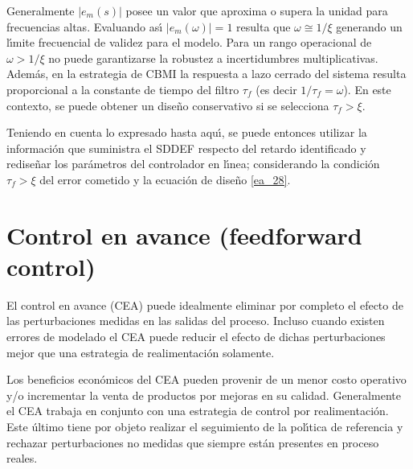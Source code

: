 Generalmente $|e_{m}(s)|$ posee un valor que aproxima o supera la unidad para frecuencias altas. Evaluando
as{\'\i} $|e_{m}(\omega)|=1$ resulta que $\omega\cong 1/\xi$ generando un l{\'\i}mite frecuencial de validez para el
modelo. Para un rango operacional de $\omega>1/\xi$ no puede garantizarse la robustez a incertidumbres
multiplicativas. Adem{\'a}s, en la estrategia de CBMI la respuesta a lazo cerrado del sistema resulta
proporcional a la constante de tiempo del filtro $\tau_{f}$ (es decir $1/\tau_{f}=\omega$). En este
contexto, se puede obtener un dise{\~n}o conservativo si se selecciona $\tau_{f}> \xi$.

Teniendo en cuenta lo expresado hasta aqu{\'\i}, se puede entonces utilizar la informaci{\'o}n que suministra el
SDDEF respecto del retardo identificado y redise{\~n}ar los par{\'a}metros del controlador en l{\'\i}nea; considerando la
condici{\'o}n $\tau_{f}> \xi$ del error cometido y la ecuaci{\'o}n de dise{\~n}o \ref{ea_28}.

\section{Control en avance (feedforward control)}\label{A_6}
El control en avance (CEA) puede idealmente eliminar por completo el efecto de las perturbaciones medidas en
las salidas del proceso. Incluso cuando existen errores de modelado el CEA puede reducir el efecto de dichas
perturbaciones mejor que una estrategia de realimentaci{\'o}n solamente.

Los beneficios econ{\'o}micos del CEA pueden provenir de un menor costo operativo y/o incrementar la venta de
productos por mejoras en su calidad. Generalmente el CEA trabaja en conjunto con una estrategia de control
por realimentaci{\'o}n. Este {\'u}ltimo tiene por objeto realizar el seguimiento de la pol{\'\i}tica de referencia y
rechazar perturbaciones no medidas que siempre est{\'a}n presentes en proceso reales.

